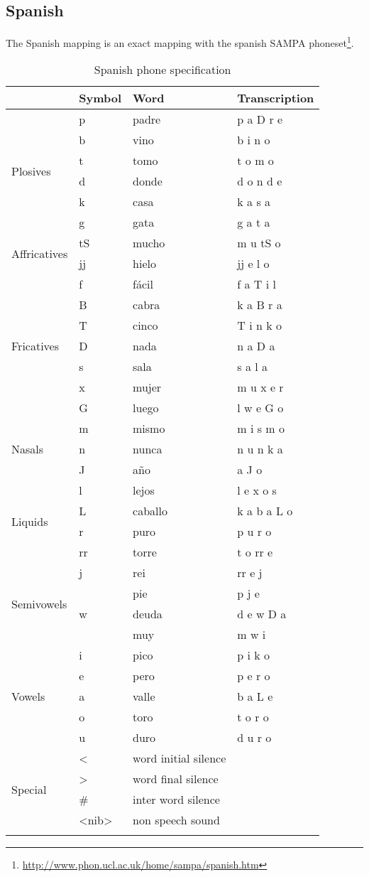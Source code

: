 \subsection{Spanish}
\label{sec:phspanish}
The Spanish mapping is an exact mapping with the spanish SAMPA
phoneset\footnote{\url{http://www.phon.ucl.ac.uk/home/sampa/spanish.htm}}.

{\small
\begin{longtable}{l|l|l|l}
	& Symbol & Word & Transcription\\
	\hline
	\multirow{6}{*}{Plosives} &
	p & padre & p a D r e\\
  & b & vino & b i n o\\
  & t & tomo & t o m o\\
  & d & donde & d o n d e\\
  & k & casa & k a s a\\
  & g & gata & g a t a\\
	\hline
	\multirow{2}{*}{Affricatives} &
	tS & mucho & m u tS o\\
	& jj & hielo & jj e l o\\
	\hline
	\multirow{7}{*}{Fricatives} &
	f & fácil & f a T i l\\
	& B & cabra & k a B r a\\
	& T & cinco & T i n k o\\
	& D & nada & n a D a\\
	& s & sala & s a l a \\
	& x & mujer & m u x e r\\
	& G & luego & l w e G o\\
	\hline
	\multirow{3}{*}{Nasals} &
	m & mismo & m i s m o\\
	& n & nunca & n u n k a\\
	& J & año & a J o\\
	\hline
	\multirow{4}{*}{Liquids} & 
	l & lejos & l e x o s\\
	& L & caballo & k a b a L o\\
	& r & puro & p u r o\\
	& rr & torre & t o rr e\\
	\hline
	\multirow{4}{*}{Semivowels} &
	j & rei & rr e j\\
	&  & pie & p j e\\
	& w & deuda & d e w D a\\
	&  & muy & m w i\\
	\hline
	\multirow{5}{*}{Vowels} &
	i & pico & p i k o\\
	& e & pero & p e r o\\
	& a & valle & b a L e\\
	& o & toro & t o r o\\
	& u & duro & d u r o\\
	\hline
	\multirow{4}{*}{Special} &
	\textless  & word initial silence & \\
	& \textgreater  & word final silence & \\
	& \# & inter word silence & \\
	& \textless nib\textgreater  & non speech sound & \\
	\hline
	\caption{Spanish phone specification}
\end{longtable}
}

